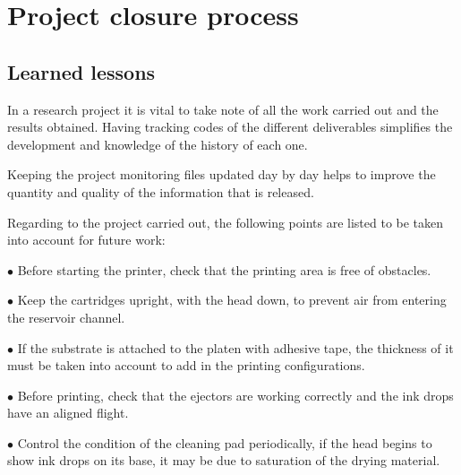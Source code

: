 \chapter{Project closure process}
\label{chap:apendiceB}

\section{Learned lessons}
In a research project it is vital to take note of all the work carried out and the results obtained. Having tracking codes of the different deliverables simplifies the development and knowledge of the history of each one.

Keeping the project monitoring files updated day by day helps to improve the quantity and quality of the information that is released.

Regarding to the project carried out, the following points are listed to be taken into account for future work:

$\bullet$ Before starting the printer, check that the printing area is free of obstacles.

$\bullet$ Keep the cartridges upright, with the head down, to prevent air from entering the reservoir channel.

$\bullet$ If the substrate is attached to the platen with adhesive tape, the thickness of it must be taken into account to add in the printing configurations.

$\bullet$ Before printing, check that the ejectors are working correctly and the ink drops have an aligned flight.

$\bullet$ Control the condition of the cleaning pad periodically, if the head begins to show ink drops on its base, it may be due to saturation of the drying material.
